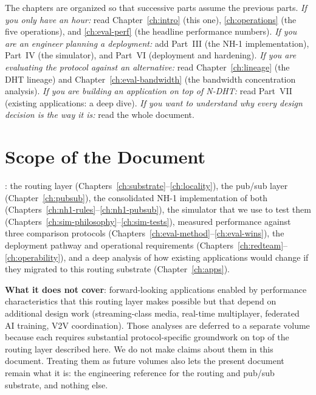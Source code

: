 \documentclass[twoside,nobib]{tufte-book}
\newcommand{\NDHT}{N-DHT\xspace}
\begin{document}
The chapters are organized so that successive parts assume the
previous parts. \emph{If you only have an hour:} read
Chapter~\ref{ch:intro} (this one), \ref{ch:operations} (the five
operations), and \ref{ch:eval-perf} (the headline performance
numbers). \emph{If you are an engineer planning a deployment:} add
Part~III (the NH-1 implementation), Part~IV (the simulator), and
Part~VI (deployment and hardening). \emph{If you are evaluating the
protocol against an alternative:} read Chapter~\ref{ch:lineage} (the
DHT lineage) and Chapter~\ref{ch:eval-bandwidth} (the bandwidth
concentration analysis). \emph{If you are building an application
on top of \NDHT:} read Part~VII (existing applications: a deep
dive). \emph{If you want to understand why every design decision is
the way it is:} read the whole document.

\section{Scope of the Document}

: the routing layer
(Chapters~\ref{ch:substrate}--\ref{ch:locality}), the pub/sub layer
(Chapter~\ref{ch:pubsub}), the consolidated NH-1 implementation of
both (Chapters~\ref{ch:nh1-rules}--\ref{ch:nh1-pubsub}), the
simulator that we use to test them
(Chapters~\ref{ch:sim-philosophy}--\ref{ch:sim-tests}), measured
performance against three comparison protocols
(Chapters~\ref{ch:eval-method}--\ref{ch:eval-wins}), the deployment
pathway and operational requirements
(Chapters~\ref{ch:redteam}--\ref{ch:operability}), and a deep
analysis of how existing applications would change if they migrated
to this routing substrate (Chapter~\ref{ch:apps}).

\textbf{What it does not cover}: forward-looking applications enabled
by performance characteristics that this routing layer makes
possible but that depend on additional design work
(streaming-class media, real-time multiplayer, federated AI training,
V2V coordination). Those analyses are deferred to a separate
volume because each requires substantial protocol-specific
groundwork on top of the routing layer described here. We do not
make claims about them in this document. Treating them as future
volumes also lets the present document remain what it is: the
engineering reference for the routing and pub/sub substrate, and
nothing else.
\end{document}
